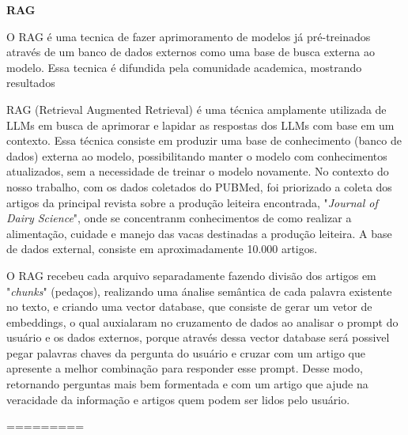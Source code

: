 \textbf{RAG}


O RAG é uma tecnica de fazer aprimoramento de modelos já pré-treinados através de um banco de dados externos como uma base de busca externa ao modelo. Essa tecnica é difundida pela comunidade academica, mostrando resultados


RAG (Retrieval Augmented Retrieval) é uma técnica amplamente utilizada de LLMs em busca de aprimorar e lapidar as respostas dos LLMs com base em um contexto. Essa técnica consiste em produzir uma base de conhecimento (banco de dados) externa ao modelo, possibilitando manter o modelo com conhecimentos atualizados, sem a necessidade de treinar o modelo novamente.  
No contexto do nosso trabalho, com os dados coletados do PUBMed, foi priorizado a coleta dos artigos da principal revista sobre a produção leiteira encontrada, "\textit{Journal of Dairy Science}", onde se concentranm conhecimentos de como realizar a alimentação, cuidade e manejo das vacas destinadas a produção leiteira.  A base de dados external, consiste em aproximadamente 10.000 artigos.


O RAG recebeu cada arquivo separadamente fazendo divisão dos artigos em "\textit{chunks}" (pedaços), realizando uma ánalise semântica de cada palavra existente no texto, e criando uma vector database, que consiste de gerar um vetor de embeddings, o qual auxialaram no cruzamento de dados ao analisar o prompt do usuário e os dados externos, porque através dessa vector database será possivel pegar palavras chaves da pergunta do usuário e cruzar com um artigo que apresente a melhor combinação para responder esse prompt. Desse modo, retornando perguntas mais bem formentada e com um artigo que ajude na veracidade da informação e artigos quem podem ser lidos pelo usuário.


=========


\begin{table}[h!]
\centering
\caption{Comparação de métricas entre modelos}
\label{tab:metricas_modelos}
\end{table}